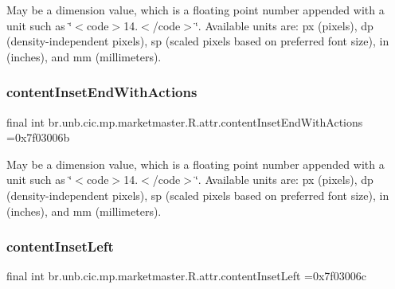 May be a dimension value, which is a floating point number appended with a unit such as \char`\"{}$<$code$>$14.\+5sp$<$/code$>$\char`\"{}. Available units are\+: px (pixels), dp (density-\/independent pixels), sp (scaled pixels based on preferred font size), in (inches), and mm (millimeters). \mbox{\label{classbr_1_1unb_1_1cic_1_1mp_1_1marketmaster_1_1R_1_1attr_a50c42251e6f11861ef846cb5e4778fc1}} 
\subsubsection{\texorpdfstring{content\+Inset\+End\+With\+Actions}{contentInsetEndWithActions}}
{\footnotesize\ttfamily final int br.\+unb.\+cic.\+mp.\+marketmaster.\+R.\+attr.\+content\+Inset\+End\+With\+Actions =0x7f03006b\hspace{0.3cm}{\ttfamily [static]}}

May be a dimension value, which is a floating point number appended with a unit such as \char`\"{}$<$code$>$14.\+5sp$<$/code$>$\char`\"{}. Available units are\+: px (pixels), dp (density-\/independent pixels), sp (scaled pixels based on preferred font size), in (inches), and mm (millimeters). \mbox{\label{classbr_1_1unb_1_1cic_1_1mp_1_1marketmaster_1_1R_1_1attr_a524c1513a6be339619184330fa2aad2c}} 
\subsubsection{\texorpdfstring{content\+Inset\+Left}{contentInsetLeft}}
{\footnotesize\ttfamily final int br.\+unb.\+cic.\+mp.\+marketmaster.\+R.\+attr.\+content\+Inset\+Left =0x7f03006c\hspace{0.3cm}{\ttfamily [static]}}


